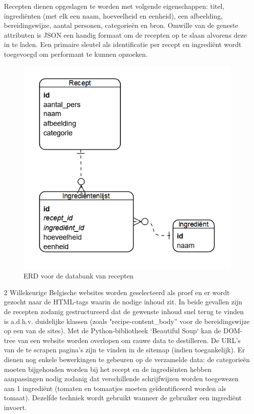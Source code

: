 \documentclass{hogent-article}
\begin{document}
Recepten dienen opgeslagen te worden met volgende eigenschappen: titel, ingrediënten (met elk een naam, hoeveelheid en eenheid), een afbeelding, bereidingswijze, aantal personen, categorieën en bron. Omwille van de geneste attributen is JSON een handig formaat om de recepten op te slaan alvorens deze in te laden. Een primaire sleutel als identificatie per recept en ingrediënt wordt toegevoegd om performant te kunnen opzoeken. 
\begin{figure}
    \centering
    \includegraphics[width=0.7\linewidth]{../voorstel/img/ERD.png}
    \caption[ERD Databank]{ERD voor de databank van recepten}
    \label{fig:erd}
\end{figure}

2 Willekeurige Belgische websites worden geselecteerd als proef en er wordt gezocht naar de HTML-tags waarin de nodige inhoud zit. In beide gevallen zijn de recepten zodanig gestructureerd dat de gewenste inhoud snel terug te vinden is a.d.h.v. duidelijke klassen (zoals "recipe-content\_body'' voor de bereidingswijze op een van de sites). Met de Python-bibliotheek `Beautiful Soup` kan de DOM-tree van een website worden overlopen om rauwe data te destilleren. De URL's van de te scrapen pagina's zijn te vinden in de sitemap (indien toegankelijk).  Er dienen nog enkele bewerkingen te gebeuren op de verzamelde data: de categorieën moeten bijgehouden worden bij het recept en de ingrediënten hebben aanpassingen nodig zodanig dat verschillende schrijfwijzen worden toegewezen aan 1 ingrediënt (tomaten en tomaatjes moeten geïdentificeerd worden als tomaat). Dezelfde techniek wordt gebruikt wanneer de gebruiker een ingrediënt invoert.
\end{document}
